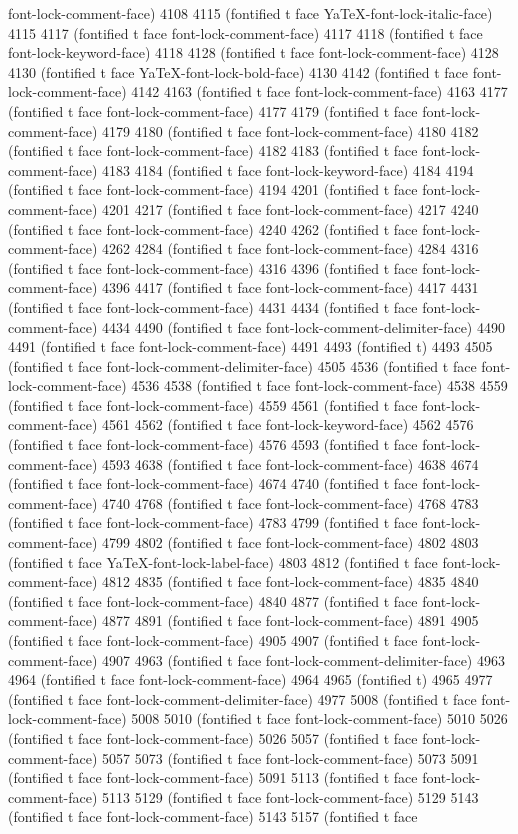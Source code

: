 {{font-lock-comment-face) 4108 4115 (fontified t face YaTeX-font-lock-italic-face) 4115 4117 (fontified t face font-lock-comment-face) 4117 4118 (fontified t face font-lock-keyword-face) 4118 4128 (fontified t face font-lock-comment-face) 4128 4130 (fontified t face YaTeX-font-lock-bold-face) 4130 4142 (fontified t face font-lock-comment-face) 4142 4163 (fontified t face font-lock-comment-face) 4163 4177 (fontified t face font-lock-comment-face) 4177 4179 (fontified t face font-lock-comment-face) 4179 4180 (fontified t face font-lock-comment-face) 4180 4182 (fontified t face font-lock-comment-face) 4182 4183 (fontified t face font-lock-comment-face) 4183 4184 (fontified t face font-lock-keyword-face) 4184 4194 (fontified t face font-lock-comment-face) 4194 4201 (fontified t face font-lock-comment-face) 4201 4217 (fontified t face font-lock-comment-face) 4217 4240 (fontified t face font-lock-comment-face) 4240 4262 (fontified t face font-lock-comment-face) 4262 4284 (fontified t face font-lock-comment-face) 4284 4316 (fontified t face font-lock-comment-face) 4316 4396 (fontified t face font-lock-comment-face) 4396 4417 (fontified t face font-lock-comment-face) 4417 4431 (fontified t face font-lock-comment-face) 4431 4434 (fontified t face font-lock-comment-face) 4434 4490 (fontified t face font-lock-comment-delimiter-face) 4490 4491 (fontified t face font-lock-comment-face) 4491 4493 (fontified t) 4493 4505 (fontified t face font-lock-comment-delimiter-face) 4505 4536 (fontified t face font-lock-comment-face) 4536 4538 (fontified t face font-lock-comment-face) 4538 4559 (fontified t face font-lock-comment-face) 4559 4561 (fontified t face font-lock-comment-face) 4561 4562 (fontified t face font-lock-keyword-face) 4562 4576 (fontified t face font-lock-comment-face) 4576 4593 (fontified t face font-lock-comment-face) 4593 4638 (fontified t face font-lock-comment-face) 4638 4674 (fontified t face font-lock-comment-face) 4674 4740 (fontified t face font-lock-comment-face) 4740 4768 (fontified t face font-lock-comment-face) 4768 4783 (fontified t face font-lock-comment-face) 4783 4799 (fontified t face font-lock-comment-face) 4799 4802 (fontified t face font-lock-comment-face) 4802 4803 (fontified t face YaTeX-font-lock-label-face) 4803 4812 (fontified t face font-lock-comment-face) 4812 4835 (fontified t face font-lock-comment-face) 4835 4840 (fontified t face font-lock-comment-face) 4840 4877 (fontified t face font-lock-comment-face) 4877 4891 (fontified t face font-lock-comment-face) 4891 4905 (fontified t face font-lock-comment-face) 4905 4907 (fontified t face font-lock-comment-face) 4907 4963 (fontified t face font-lock-comment-delimiter-face) 4963 4964 (fontified t face font-lock-comment-face) 4964 4965 (fontified t) 4965 4977 (fontified t face font-lock-comment-delimiter-face) 4977 5008 (fontified t face font-lock-comment-face) 5008 5010 (fontified t face font-lock-comment-face) 5010 5026 (fontified t face font-lock-comment-face) 5026 5057 (fontified t face font-lock-comment-face) 5057 5073 (fontified t face font-lock-comment-face) 5073 5091 (fontified t face font-lock-comment-face) 5091 5113 (fontified t face font-lock-comment-face) 5113 5129 (fontified t face font-lock-comment-face) 5129 5143 (fontified t face font-lock-comment-face) 5143 5157 (fontified t face }}
